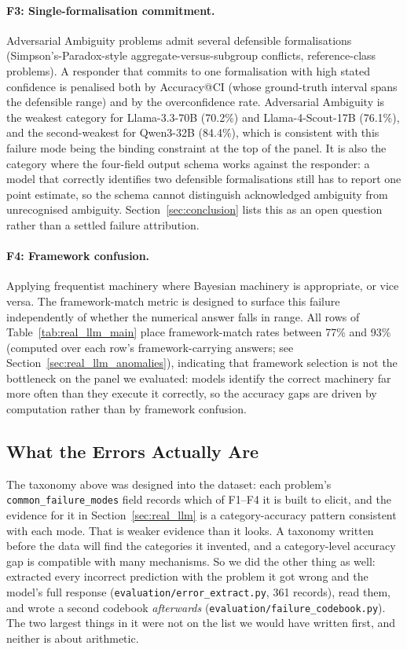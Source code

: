 \documentclass{article}
\begin{document}
\paragraph{F3: Single-formalisation commitment.} Adversarial Ambiguity problems admit several defensible formalisations (Simpson's-Paradox-style aggregate-versus-subgroup conflicts, reference-class problems). A responder that commits to one formalisation with high stated confidence is penalised both by Accuracy@CI (whose ground-truth interval spans the defensible range) and by the overconfidence rate. Adversarial Ambiguity is the weakest category for Llama-3.3-70B (70.2\%) and Llama-4-Scout-17B (76.1\%), and the second-weakest for Qwen3-32B (84.4\%), which is consistent with this failure mode being the binding constraint at the top of the panel. It is also the category where the four-field output schema works against the responder: a model that correctly identifies two defensible formalisations still has to report one point estimate, so the schema cannot distinguish acknowledged ambiguity from unrecognised ambiguity. Section~\ref{sec:conclusion} lists this as an open question rather than a settled failure attribution.

\paragraph{F4: Framework confusion.} Applying frequentist machinery where Bayesian machinery is appropriate, or vice versa. The framework-match metric is designed to surface this failure independently of whether the numerical answer falls in range. All rows of Table~\ref{tab:real_llm_main} place framework-match rates between 77\% and 93\% (computed over each row's framework-carrying answers; see Section~\ref{sec:real_llm_anomalies}), indicating that framework selection is not the bottleneck on the panel we evaluated: models identify the correct machinery far more often than they execute it correctly, so the accuracy gaps are driven by computation rather than by framework confusion.

\subsection{What the Errors Actually Are}
\label{sec:codebook}

The taxonomy above was designed into the dataset: each problem's \texttt{common\_failure\_modes} field records which of F1--F4 it is built to elicit, and the evidence for it in Section~\ref{sec:real_llm} is a category-accuracy pattern consistent with each mode. That is weaker evidence than it looks. A taxonomy written before the data will find the categories it invented, and a category-level accuracy gap is compatible with many mechanisms. So we did the other thing as well: extracted every incorrect prediction with the problem it got wrong and the model's full response (\texttt{evaluation/error\_extract.py}, 361 records), read them, and wrote a second codebook \emph{afterwards} (\texttt{evaluation/failure\_codebook.py}). The two largest things in it were not on the list we would have written first, and neither is about arithmetic.
\end{document}

